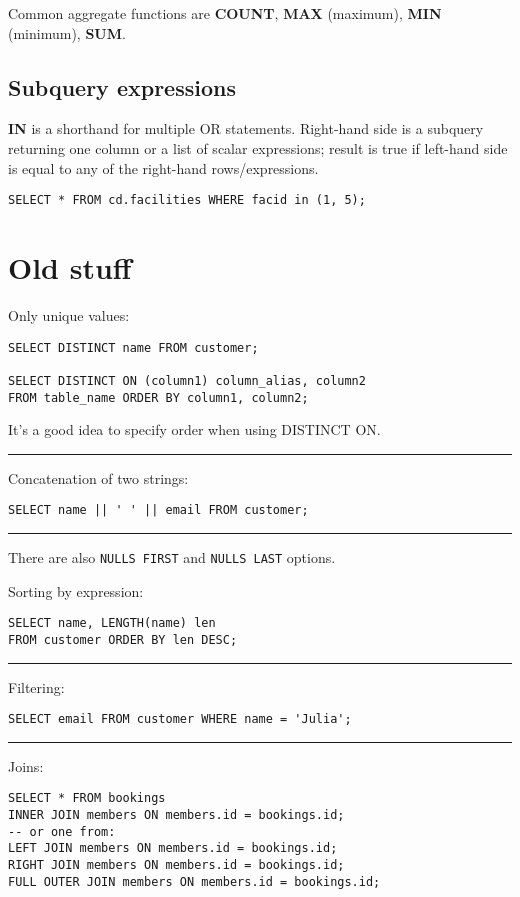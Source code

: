 \documentclass{charun}
\begin{document}
\begin{multicols*}{2}
Common aggregate functions are
\textbf{COUNT},
\textbf{MAX} (maximum),
\textbf{MIN} (minimum),
\textbf{SUM}.

\subsection{Subquery expressions}
\textbf{IN} is a shorthand for multiple OR statements.
Right-hand side is a subquery returning one column or a list of scalar expressions; result is true if left-hand side is equal to any of the right-hand rows/expressions.
\begin{verbatim}
SELECT * FROM cd.facilities WHERE facid in (1, 5);
\end{verbatim}

\newpage
\section{Old stuff}
Only unique values:
\begin{verbatim}
SELECT DISTINCT name FROM customer;

SELECT DISTINCT ON (column1) column_alias, column2
FROM table_name ORDER BY column1, column2;
\end{verbatim}

It's a good idea to specify order when using DISTINCT ON.

\hrule

Concatenation of two strings:
\begin{verbatim}
SELECT name || ' ' || email FROM customer;
\end{verbatim}

\hrule

There are also \texttt{NULLS FIRST} and \texttt{NULLS LAST} options.

Sorting by expression:
\begin{verbatim}
SELECT name, LENGTH(name) len
FROM customer ORDER BY len DESC;
\end{verbatim}

\hrule

Filtering:
\begin{verbatim}
SELECT email FROM customer WHERE name = 'Julia';
\end{verbatim}

\hrule

Joins:
\begin{verbatim}
SELECT * FROM bookings
INNER JOIN members ON members.id = bookings.id;
-- or one from:
LEFT JOIN members ON members.id = bookings.id;
RIGHT JOIN members ON members.id = bookings.id;
FULL OUTER JOIN members ON members.id = bookings.id;
\end{verbatim}


\end{multicols*}
\end{document}
